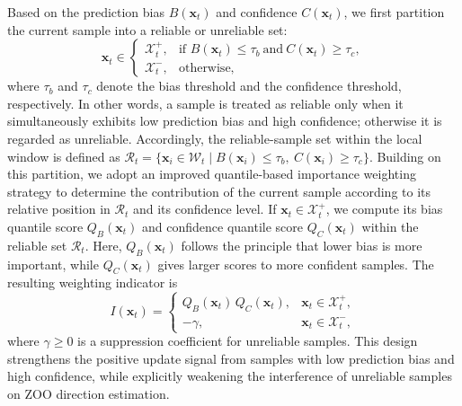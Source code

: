 Based on the prediction bias $B(\mathbf{x}_t)$ and confidence $C(\mathbf{x}_t)$, we first partition the current sample into a reliable or unreliable set:
\begin{equation}
\label{eq:sample_partition}
\mathbf{x}_t \in
\begin{cases}
\mathcal{X}_t^{+}, & \text{if } B(\mathbf{x}_t)\le \tau_b \ \text{and}\ C(\mathbf{x}_t)\ge \tau_c,\\[2pt]
\mathcal{X}_t^{-}, & \text{otherwise},
\end{cases}
\end{equation}
where $\tau_b$ and $\tau_c$ denote the bias threshold and the confidence threshold, respectively.
In other words, a sample is treated as reliable only when it simultaneously exhibits low prediction bias and high confidence; otherwise it is regarded as unreliable.
Accordingly, the reliable-sample set within the local window is defined as $\mathcal{R}_t=\{\mathbf{x}_i\in \mathcal W_t \mid B(\mathbf{x}_i)\le \tau_b,\ C(\mathbf{x}_i)\ge \tau_c\}$.
Building on this partition, we adopt an improved quantile-based importance weighting strategy to determine the contribution of the current sample according to its relative position in $\mathcal{R}_t$ and its confidence level.
If $\mathbf{x}_t\in\mathcal{X}_t^{+}$, we compute its bias quantile score $Q_B(\mathbf{x}_t)$ and confidence quantile score $Q_C(\mathbf{x}_t)$ within the reliable set $\mathcal{R}_t$.
Here, $Q_B(\mathbf{x}_t)$ follows the principle that lower bias is more important, while $Q_C(\mathbf{x}_t)$ gives larger scores to more confident samples.
The resulting weighting indicator is
\begin{equation}
\label{eq:indicator_weight}
I(\mathbf{x}_t)=
\begin{cases}
Q_B(\mathbf{x}_t)\,Q_C(\mathbf{x}_t), & \mathbf{x}_t\in \mathcal X_t^{+},\\[4pt]
-\gamma, & \mathbf{x}_t\in \mathcal X_t^{-},
\end{cases}
\end{equation}
where $\gamma\ge 0$ is a suppression coefficient for unreliable samples.
This design strengthens the positive update signal from samples with low prediction bias and high confidence, while explicitly weakening the interference of unreliable samples on ZOO direction estimation.

